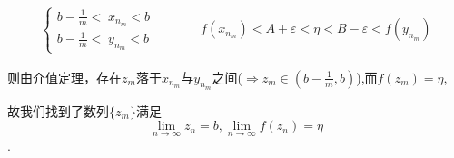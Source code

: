 \documentclass{ctexart}
\begin{document}
\begin{align*}
\left\{
\begin{aligned}
b-\frac{1}{m}<\;x_{n_m}< b\\
b-\frac{1}{m}<\;y_{n_m}< b
\end{aligned}
\right.
&& \qquad f(x_{n_m})<A+\varepsilon<\eta <B-\varepsilon< f(y_{n_m})
\end{align*}

则由介值定理，存在$z_m$落于$x_{n_m}$与$y_{n_m}$之间($\Rightarrow z_m \in (b-\frac{1}{m},b)$),而$f(z_m)=\eta$,

故我们找到了数列$\{z_m\}$满足$$\lim\limits_{n\rightarrow \infty}z_n=b,\lim\limits_{n\rightarrow \infty}f(z_n)=\eta$$.
\end{document}
